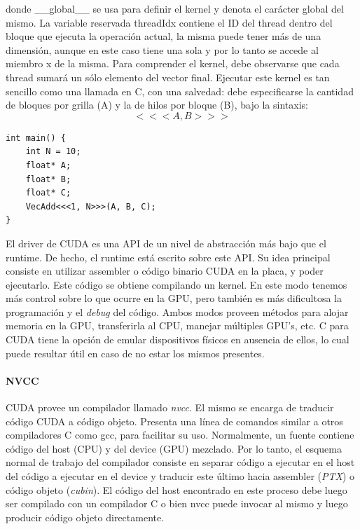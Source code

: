 donde \_\_global\_\_ se usa para definir el kernel y denota el car\'acter global del mismo.
La variable reservada threadIdx contiene el ID del thread dentro del bloque que ejecuta la operaci\'on actual, la misma puede tener m\'as de una dimensi\'on, aunque en este caso tiene una sola y por lo tanto se accede al miembro x de la misma.
Para comprender el kernel, debe observarse que cada thread sumar\'a un s\'olo elemento del vector final.
Ejecutar este kernel es tan sencillo como una llamada en C, con una salvedad: debe especificarse la cantidad de bloques por grilla (A) y la de hilos por bloque (B), bajo la sintaxis:
$$<<<A , B >>>$$

\begin{verbatim}
int main() {
    int N = 10;
    float* A;
    float* B;
    float* C;
    VecAdd<<<1, N>>>(A, B, C);
}

\end{verbatim}


El driver de CUDA es una API de un nivel de abstracci\'on m\'as bajo que el runtime.
De hecho, el runtime est\'a escrito sobre este API.
Su idea principal consiste en utilizar assembler o c\'odigo binario CUDA en la placa, y poder ejecutarlo.
Este c\'odigo se obtiene compilando un kernel.
En este modo tenemos m\'as control sobre lo que ocurre en la GPU, pero tambi\'en es m\'as dificultosa la programaci\'on y el {\em debug} del c\'odigo.
Ambos modos proveen m\'etodos para alojar memoria en la GPU, transferirla al CPU, manejar m\'ultiples GPU's, etc.
C para CUDA tiene la opci\'on de emular dispositivos f\'isicos en ausencia de ellos, lo cual puede resultar \'util en caso de no estar los mismos presentes.

\paragraph{NVCC}
CUDA provee un compilador llamado {\em nvcc}.
El mismo se encarga de traducir c\'odigo CUDA a c\'odigo objeto.
Presenta una l\'inea de comandos similar a otros compiladores C como gcc, para facilitar su uso.
Normalmente, un fuente contiene c\'odigo del host (CPU) y del device (GPU) mezclado.
Por lo tanto, el esquema normal de trabajo del compilador consiste en separar c\'odigo a ejecutar en el host del c\'odigo a ejecutar en el device y traducir este \'ultimo hacia assembler ({\em PTX}) o c\'odigo objeto ({\em cubin}).
El c\'odigo del host encontrado en este proceso debe luego ser compilado con un compilador C o bien nvcc puede invocar al mismo y luego producir c\'odigo objeto directamente.

